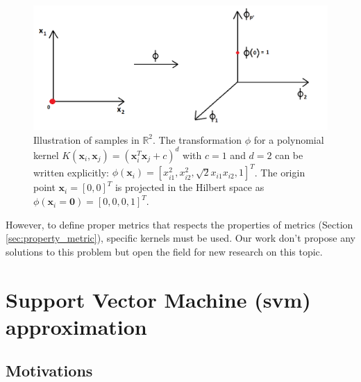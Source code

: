 \begin{figure}[h!]
\centering
\includegraphics[width=0.9\linewidth]{images/Kernel_nonHomogene}
\caption{Illustration of samples in $\mathbb{R}^2$. The transformation $\phi$ for a polynomial kernel $K(\textbf{x}_i,\textbf{x}_j)=(\textbf{x}_i^T \textbf{x}_j + c)^d$ with $c=1$ and $d=2$ can be written explicitly: $\phi(\textbf{x}_i)= [x_{i1}^2, x_{i2}^2, \sqrt{2} x_{i1} x_{i2}, 1]^T$. The origin point $\textbf{x}_i=[0,0]^T$ is projected in the Hilbert space as $\phi(\textbf{x}_i=\textbf{0}) = [0, 0, 0, 1]^T$.}
\label{fig:Kernel_nonHomogene}
\end{figure}

However, to define proper metrics that respects the properties of metrics (Section \ref{sec:property_metric}), specific kernels must be used. Our work don't propose any solutions to this problem but open the field for new research on this topic. 



\section{Support Vector Machine ({\sc svm}) approximation}
\subsection{Motivations}

